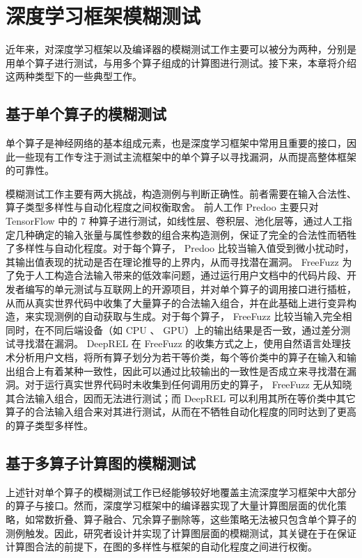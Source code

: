\section{深度学习框架模糊测试}

近年来，对深度学习框架以及编译器的模糊测试工作主要可以被分为两种，分别是用单个算子进行测试，与用多个算子组成的计算图进行测试。接下来，本章将介绍这两种类型下的一些典型工作。

\subsection{基于单个算子的模糊测试}

单个算子是神经网络的基本组成元素，也是深度学习框架中常用且重要的接口，因此一些现有工作专注于测试主流框架中的单个算子以寻找漏洞，从而提高整体框架的可靠性。

模糊测试工作主要有两大挑战，构造测例与判断正确性。前者需要在输入合法性、算子类型多样性与自动化程度之间权衡取舍。
前人工作 Predoo\cite{predoo} 主要只对 TensorFlow 中的 7 种算子进行测试，如线性层、卷积层、池化层等，通过人工指定几种确定的输入张量与属性参数的组合来构造测例，保证了完全的合法性而牺牲了多样性与自动化程度。对于每个算子， Predoo 比较当输入值受到微小扰动时，其输出值表现的扰动是否在理论推导的上界内，从而寻找潜在漏洞。
FreeFuzz\cite{freefuzz} 为了免于人工构造合法输入带来的低效率问题，通过运行用户文档中的代码片段、开发者编写的单元测试与互联网上的开源项目，并对单个算子的调用接口进行插桩，从而从真实世界代码中收集了大量算子的合法输入组合，并在此基础上进行变异构造，来实现测例的自动获取与生成。对于每个算子， FreeFuzz 比较当输入完全相同时，在不同后端设备（如 CPU 、 GPU）上的输出结果是否一致，通过差分测试寻找潜在漏洞。
DeepREL\cite{deeprel} 在 FreeFuzz 的收集方式之上，使用自然语言处理技术分析用户文档，将所有算子划分为若干等价类，每个等价类中的算子在输入和输出组合上有着某种一致性，因此可以通过比较输出的一致性是否成立来寻找潜在漏洞。对于运行真实世界代码时未收集到任何调用历史的算子， FreeFuzz 无从知晓其合法输入组合，因而无法进行测试；而 DeepREL 可以利用其所在等价类中其它算子的合法输入组合来对其进行测试，从而在不牺牲自动化程度的同时达到了更高的算子类型多样性。

\subsection{基于多算子计算图的模糊测试}

上述针对单个算子的模糊测试工作已经能够较好地覆盖主流深度学习框架中大部分的算子与接口。然而，深度学习框架中的编译器实现了大量计算图层面的优化策略，如常数折叠、算子融合、冗余算子删除等，这些策略无法被只包含单个算子的测例触发。因此，研究者设计并实现了计算图层面的模糊测试，其关键在于在保证计算图合法的前提下，在图的多样性与框架的自动化程度之间进行权衡。

